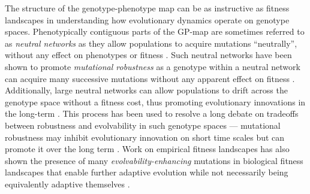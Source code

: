 The structure of the genotype-phenotype map can be as instructive as fitness landscapes in understanding how evolutionary dynamics operate on genotype spaces.
Phenotypically contiguous parts of the GP-map are sometimes referred to as \textit{neutral networks} as they allow populations to acquire mutations ``neutrally'', without any effect on phenotypes or fitness \citep{reidys2001neutrality, ahnert2017structural, croitoru2022punctuated}.
Such neutral networks have been shown to promote \textit{mutational robustness} as a genotype within a neutral network can acquire many successive mutations without any apparent effect on fitness \citep{van1999neutral}.
Additionally, large neutral networks can allow populations to drift across the genotype space without a fitness cost, thus promoting evolutionary innovations in the long-term \citep{jorg2008neutral, huynen1996smoothness, shackleton2000investigation, huynen1996exploring, amitai2007latent, banzhaf2006evolution, hu2025neutrality}.
This process has been used to resolve a long debate on tradeoffs between robustness and evolvability in such genotype spaces --- mutational robustness may inhibit evolutionary innovation on short time scales but can promote it over the long term \citep{wagner2008robustness, wagner2013robustness, masel2010robustness, hu2018neutrality}.
Work on empirical fitness landscapes has also shown the presence of many \textit{evolvability-enhancing} mutations in biological fitness landscapes that enable further adaptive evolution while not necessarily being equivalently adaptive themselves \citep{wagner2023evolvability}.

